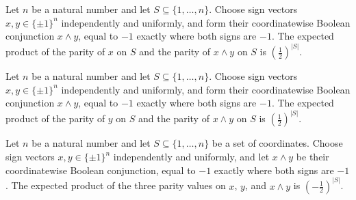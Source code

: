 \begin{theorem}
\label{FABL.expect_parity_mul_parity_signCubeAnd_first}
\leanok
{}
Let $n$ be a natural number and let $S\subseteq\{1,\ldots,n\}$. Choose sign vectors
$x,y\in\{\pm1\}^n$ independently and uniformly, and form their coordinatewise Boolean
conjunction $x\wedge y$, equal to $-1$ exactly where both signs are $-1$. The expected
product of the parity of $x$ on $S$ and the parity of $x\wedge y$ on $S$ is
$(\frac12)^{|S|}$.
\end{theorem}

\begin{theorem}
\label{FABL.expect_parity_mul_parity_signCubeAnd_second}
\leanok
{}
Let $n$ be a natural number and let $S\subseteq\{1,\ldots,n\}$. Choose sign vectors
$x,y\in\{\pm1\}^n$ independently and uniformly, and form their coordinatewise Boolean
conjunction $x\wedge y$, equal to $-1$ exactly where both signs are $-1$. The expected
product of the parity of $y$ on $S$ and the parity of $x\wedge y$ on $S$ is
$(\frac12)^{|S|}$.
\end{theorem}

\begin{theorem}
\label{FABL.expect_parity_mul_parity_mul_parity_signCubeAnd}
\leanok
{}
Let $n$ be a natural number and let $S\subseteq\{1,\ldots,n\}$ be a set of coordinates.
Choose sign vectors $x,y\in\{\pm1\}^n$ independently and uniformly, and let $x\wedge y$
be their coordinatewise Boolean conjunction, equal to $-1$ exactly where both signs are
$-1$. The expected product of the three parity values on $x$, $y$, and $x\wedge y$ is
$(-\frac12)^{|S|}$.
\end{theorem}

